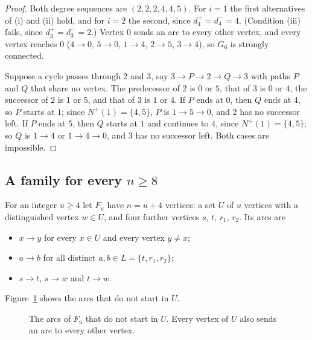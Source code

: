 \documentclass[11pt]{article}
\begin{document}
\begin{proof}
Both degree sequences are $(2,2,2,4,4,5)$. For $i=1$ the first alternatives of (i) and (ii) hold, and for $i=2$ the second, since $d^+_4=d^-_4=4$. (Condition (iii) fails, since $d^+_3=d^-_3=2$.) Vertex $0$ sends an arc to every other vertex, and every vertex reaches $0$ ($4\to0$, $5\to0$, $1\to4$, $2\to5$, $3\to4$), so $G_6$ is strongly connected.

Suppose a cycle passes through $2$ and $3$, say $3\to P\to2\to Q\to3$ with paths $P$ and $Q$ that share no vertex. The predecessor of $2$ is $0$ or $5$, that of $3$ is $0$ or $4$, the successor of $2$ is $1$ or $5$, and that of $3$ is $1$ or $4$. If $P$ ends at $0$, then $Q$ ends at $4$, so $P$ starts at $1$; since $N^+(1)=\{4,5\}$, $P$ is $1\to5\to0$, and $2$ has no successor left. If $P$ ends at $5$, then $Q$ starts at $1$ and continues to $4$, since $N^+(1)=\{4,5\}$; so $Q$ is $1\to4$ or $1\to4\to0$, and $3$ has no successor left. Both cases are impossible.
\end{proof}

\subsection{A family for every \texorpdfstring{$n\ge8$}{n >= 8}}
For an integer $u\ge4$ let $F_u$ have $n=u+4$ vertices: a set $U$ of $u$ vertices with a distinguished vertex $w\in U$, and four further vertices $s$, $t$, $r_1$, $r_2$. Its arcs are
\begin{itemize}
\item $x\to y$ for every $x\in U$ and every vertex $y\ne x$;
\item $a\to b$ for all distinct $a,b\in L=\{t,r_1,r_2\}$;
\item $s\to t$, $s\to w$ and $t\to w$.
\end{itemize}
Figure~\ref{fig:F} shows the arcs that do not start in $U$.

\begin{figure}[ht]
\centering
{}
\caption{The arcs of $F_u$ that do not start in $U$. Every vertex of $U$ also sends an arc to every other vertex.}\label{fig:F}
\end{figure}
\end{document}
